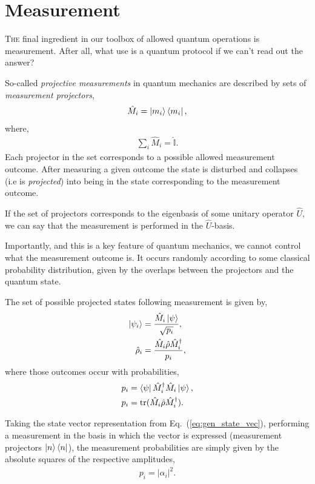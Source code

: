 \documentclass[aps,pra,twocolumn,amsmath,amssymb,nofootinbib,superscriptaddress]{revtex4}
\newcommand{\dropcap}[2]{\lettrine[lines=2, findent=3pt, nindent=0pt]{#1}{#2}}
\begin{document}
%
%

\section{Measurement}

\dropcap{T}{he} final ingredient in our toolbox of allowed quantum operations is measurement. After all, what use is a quantum protocol if we can't read out the answer?

So-called \textit{projective measurements} in quantum mechanics are described by sets of \textit{measurement projectors},
\begin{align}
\hat{M}_i = \ket{m_i}\bra{m_i},	
\end{align}
where,
\begin{align}
\sum_i \hat{M}_i = \hat{\mathbb{I}}.	
\end{align}
Each projector in the set corresponds to a possible allowed measurement outcome. After measuring a given outcome the state is disturbed and collapses (i.e is \textit{projected}) into being in the state corresponding to the measurement outcome.

If the set of projectors corresponds to the eigenbasis of some unitary operator $\hat{U}$, we can say that the measurement is performed in the $\hat{U}$-basis.

Importantly, and this is a key feature of quantum mechanics, we cannot control what the measurement outcome is. It occurs randomly according to some classical probability distribution, given by the overlaps between the projectors and the quantum state.

The set of possible projected states following measurement is given by,
\begin{align}\label{eq:meas_proj_def}
\ket{\psi_i} &= \frac{\hat{M}_i \ket\psi}{\sqrt{p_i}},\nonumber\\
\hat\rho_i &= \frac{\hat{M}_i\hat\rho\hat{M}_i^\dag}{p_i},
\end{align}
where those outcomes occur with probabilities,
\begin{align}\label{eq:meas_prob_def}
p_i &= \bra\psi \hat{M}_i^\dag \hat{M}_i\ket\psi,\nonumber\\
p_i &= \mathrm{tr}(\hat{M}_i\hat\rho\hat{M}_i^\dag).
\end{align}

Taking the state vector representation from Eq.~(\ref{eq:gen_state_vec}), performing a measurement in the basis in which the vector is expressed (measurement projectors \mbox{$\ket{n}\bra{n}$}), the measurement probabilities are simply given by the absolute squares of the respective amplitudes,
\begin{align}
p_i = |\alpha_i|^2.	
\end{align}
\end{document}
